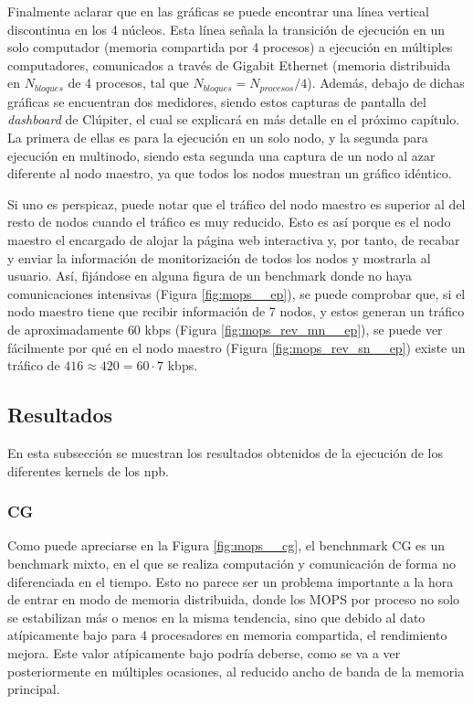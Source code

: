Finalmente aclarar que en las gráficas se puede encontrar una línea vertical discontinua en los 4 núcleos. Esta línea señala la transición de ejecución en un solo computador (memoria compartida por 4 procesos) a ejecución en múltiples computadores, comunicados a través de Gigabit Ethernet (memoria distribuida en $N_{bloques}$ de 4 procesos, tal que $N_{bloques} = N_{procesos} / 4$). Además, debajo de dichas gráficas se encuentran dos medidores, siendo estos capturas de pantalla del \textit{dashboard} de Clúpiter, el cual se explicará en más detalle en el próximo capítulo. La primera de ellas es para la ejecución en un solo nodo, y la segunda para ejecución en multinodo, siendo esta segunda una captura de un nodo al azar diferente al nodo maestro, ya que todos los nodos muestran un gráfico idéntico.

Si uno es perspicaz, puede notar que el tráfico del nodo maestro es superior al del resto de nodos cuando el tráfico es muy reducido. Esto es así porque es el nodo maestro el encargado de alojar la página web interactiva y, por tanto, de recabar y enviar la información de monitorización de todos los nodos y mostrarla al usuario. Así, fijándose en alguna figura de un benchmark donde no haya comunicaciones intensivas (Figura \ref{fig:mops__ep}), se puede comprobar que, si el nodo maestro tiene que recibir información de 7 nodos, y estos generan un tráfico de aproximadamente $60$ kbps (Figura \ref{fig:mops_rev_mn__ep}), se puede ver fácilmente por qué en el nodo maestro (Figura \ref{fig:mops_rev_sn__ep}) existe un tráfico de $416 \approx 420 = 60 \cdot 7$ kbps.

\subsection{Resultados}
\label{ssec:resultados}
En esta subsección se muestran los resultados obtenidos de la ejecución de los diferentes kernels de los \acrlong{npb}.

\subsubsection{CG}
\label{sssec:resultados__cg}
Como puede apreciarse en la Figura \ref{fig:mops__cg}, el benchnmark CG es un benchmark mixto, en el que se realiza computación y comunicación de forma no diferenciada en el tiempo. Esto no parece ser un problema importante a la hora de entrar en modo de memoria distribuida, donde los MOPS por proceso no solo se estabilizan más o menos en la misma tendencia, sino que debido al dato atípicamente bajo para 4 procesadores en memoria compartida, el rendimiento mejora. Este valor atípicamente bajo podría deberse, como se va a ver posteriormente en múltiples ocasiones, al reducido ancho de banda de la memoria principal.

